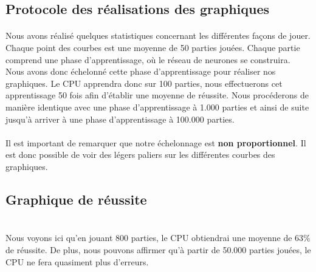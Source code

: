 \documentclass{article}
\begin{document}
  \subsection{Protocole des réalisations des graphiques}
  \paragraph{}
    Nous avons réalisé quelques statistiques concernant les différentes façons de jouer.
    Chaque point des courbes est une moyenne de 50 parties jouées. Chaque partie comprend une phase d'apprentissage,
    où le réseau de neurones se construira. Nous avons donc échelonné cette phase d'apprentissage pour réaliser nos graphiques.
    Le CPU apprendra donc sur 100 parties, nous effectuerons cet apprentissage 50 fois afin d'établir une moyenne de réussite.
    Nous procéderons de manière identique avec une phase d'apprentissage à 1.000 parties et ainsi de suite jusqu'à arriver à une phase d'apprentissage à 100.000 parties.
  \paragraph{}
    Il est important de remarquer que notre échelonnage est \textbf{non proportionnel}. Il est donc possible de voir
    des légers paliers sur les différentes courbes des graphiques.
  
  \subsection{Graphique de réussite}
  \paragraph{}
    \\
    Nous voyons ici qu'en jouant 800 parties, le CPU obtiendrai une moyenne de 63\% de réussite. De
    plus, nous pouvons affirmer qu'à partir de 50.000 parties jouées, le CPU ne fera quasiment plus d'erreurs.\\
    
\end{document}
